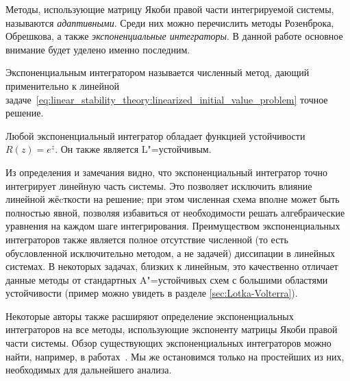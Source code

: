 Методы, использующие матрицу Якоби правой части интегрируемой системы, называются \emph{адаптивными}.
Среди них можно перечислить методы Розенброка, Обрешкова, а также \emph{экспоненциальные интеграторы}.
В данной работе основное внимание будет уделено именно последним.

\begin{definition}
    \label{definition:exponential_integrators:exponential_integrator}
    Экспоненциальным интегратором называется численный метод,
    дающий применительно к линейной задаче~\eqref{eq:linear_stability_theory:linearized_initial_value_problem} точное решение.
\end{definition}

\begin{remark}
    \label{remark:exponential_integrators:exponential_integrator_stability_function}
    Любой экспоненциальный интегратор обладает функцией устойчивости $ R(z) = e^z $.
    Он также является L"=устойчивым.
\end{remark}

Из определения и замечания видно, что экспоненциальный интегратор точно интегрирует линейную часть системы.
Это позволяет исключить влияние линейной жёcткости на решение;
при этом численная схема вполне может быть полностью явной,
позволяя избавиться от необходимости решать алгебраические уравнения на каждом шаге интегрирования.
Преимуществом экспоненциальных интеграторов также является полное отсутствие численной
(то есть обусловленной исключительно методом, а не задачей) диссипации в линейных системах.
В некоторых задачах, близких к линейным, это качественно отличает данные методы от
стандартных A"=устойчивых схем с большими областями устойчивости
(пример можно увидеть в разделе \ref{sec:Lotka-Volterra}).

Некоторые авторы также расширяют определение экспоненциальных интеграторов на все методы,
использующие экспоненту матрицы Якоби правой части системы.
Обзор существующих экспоненциальных интеграторов можно найти, например,
в работах~\cite{minchev2005expint, hochbruck_ostermann_2010, hollevoet2013exponential_fitting}.
Мы же остановимся только на простейших из них, необходимых для дальнейшего анализа.

